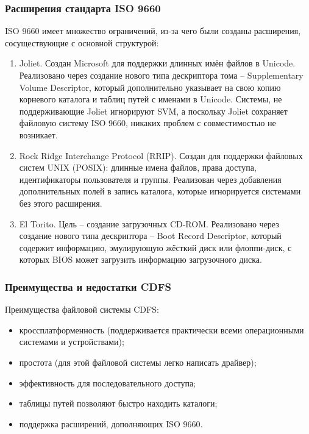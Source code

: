 \subsubsection{Расширения стандарта ISO 9660}

ISO 9660 имеет множество ограничений, из-за чего были созданы расширения, сосуществующие с основной структурой:

\begin{enumerate}
\item Joliet. Создан Microsoft для поддержки длинных имён файлов в Unicode. Реализовано через создание нового типа дескриптора тома -- Supplementary Volume Descriptor,
который дополнительно указывает на свою копию корневого каталога и таблиц путей с именами в Unicode. Системы, не поддерживающие Joliet игнорируют SVM,
а поскольку Joliet сохраняет файловую систему ISO 9660, никаких проблем с совместимостью не возникает.
\item Rock Ridge Interchange Protocol (RRIP). Создан для поддержки файловых систем UNIX (POSIX): длинные имена файлов, права доступа, идентификаторы пользователя и группы.
Реализован через добавления дополнительных полей в запись каталога, которые игнорируется системами без этого расширения.
\item El Torito. Цель -- создание загрузочных CD-ROM. Реализовано через создание нового типа дескриптора -- Boot Record Descriptor, который содержит информацию,
эмулирующую жёсткий диск или флоппи-диск, с которых BIOS может загрузить информацию загрузочного диска.
\end{enumerate}

\subsubsection{Преимущества и недостатки CDFS}

Преимущества файловой системы CDFS:

\begin{itemize}
\item кроссплатформенность (поддерживается практически всеми операционными системами и устройствами);
\item простота (для этой файловой системы легко написать драйвер);
\item эффективность для последовательного доступа;
\item таблицы путей позволяют быстро находить каталоги;
\item поддержка расширений, дополняющих ISO 9660.
\end{itemize}

